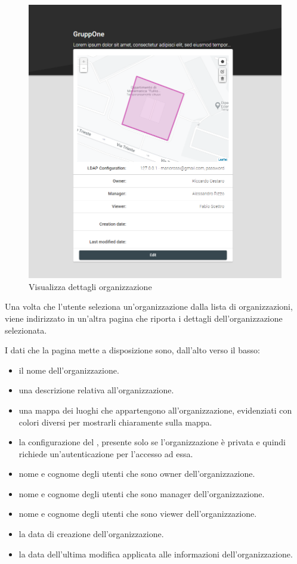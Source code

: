 \documentclass[../manuale-utente.tex]{subfiles}
\begin{document}
\begin{figure}[H]
    \centering
    \includegraphics[width=120mm]{img/web-app/visualizza-dettagli-organizzazione.png}
    \caption{Visualizza dettagli organizzazione}%
    \label{fig:web_app_visualizza_dettagli_organizzazione}
\end{figure}

Una volta che l'utente seleziona un'organizzazione dalla lista di organizzazioni, viene indirizzato in un'altra pagina che riporta i dettagli dell'organizzazione selezionata.

I dati che la pagina mette a disposizione sono, dall'alto verso il basso:
\begin{itemize}
    \item il nome dell'organizzazione.
    \item una descrizione relativa all'organizzazione.
    \item una mappa dei luoghi che appartengono all'organizzazione, evidenziati con colori diversi per mostrarli chiaramente sulla mappa.
    \item la configurazione del , presente solo se l'organizzazione è privata e quindi richiede un'autenticazione per l'accesso ad essa.
    \item nome e cognome degli utenti che sono owner dell'organizzazione.
    \item nome e cognome degli utenti che sono manager dell'organizzazione.
    \item nome e cognome degli utenti che sono viewer dell'organizzazione.
    \item la data di creazione dell'organizzazione.
    \item la data dell'ultima modifica applicata alle informazioni dell'organizzazione.
\end{itemize}
\end{document}
